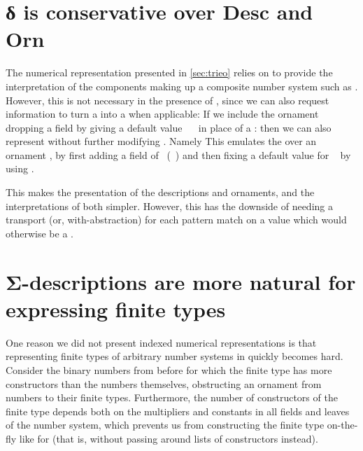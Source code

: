 

\section{δ is conservative over Desc and Orn}
The numerical representation presented in \autoref{sec:trieo} relies on  to provide the interpretation of the components making up a composite number system such as . However, this is not necessary in the presence of , since we can also request information to turn a  into a  when applicable:
If we include the ornament  dropping a field by giving a default value \ \  in place of a :
then we can also represent  without further modifying . Namely
This emulates the  over an ornament , by first adding a field of \ (\ ) and then fixing a default value for \  by using .

This makes the presentation of the descriptions and ornaments, and the interpretations of both simpler. However, this has the downside of needing a transport (or, with-abstraction) for each pattern match on a value which would otherwise be a .


\section{Σ-descriptions are more natural for expressing finite types}
One reason we did not present indexed numerical representations is that representing finite types of arbitrary number systems in  quickly becomes hard. Consider the binary numbers from before
for which the finite type
has more constructors than the numbers themselves, obstructing an ornament from numbers to their finite types. Furthermore, the number of constructors of the finite type depends both on the multipliers and constants in all fields and leaves of the number system, which prevents us from constructing the finite type on-the-fly like for  (that is, without passing around lists of constructors instead).

